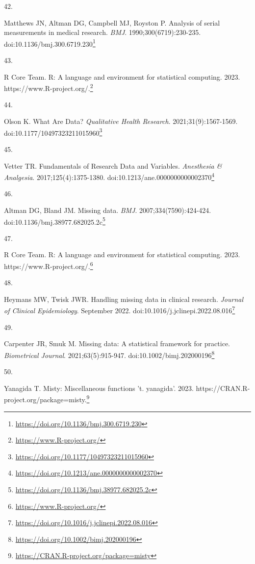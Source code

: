 \documentclass[
  a4paper,
]{book}
\newlength{\cslhangindent}
\newlength{\csllabelwidth}
\newlength{\cslentryspacingunit} %
\newenvironment{CSLReferences}[2] %
 {%
  \setlength{\parindent}{0pt}
  \ifodd #1
  \let\oldpar\par
  \def\par{\hangindent=\cslhangindent\oldpar}
  \fi
  \setlength{\parskip}{#2\cslentryspacingunit}
 }%
 {}
\newcommand{\CSLLeftMargin}[1]{\parbox[t]{\csllabelwidth}{#1}}
\newcommand{\CSLRightInline}[1]{\parbox[t]{\linewidth - \csllabelwidth}{#1}\break}
\renewcommand{\href}[2]{#2\footnote{\url{#1}}}
\begin{document}
\begin{CSLReferences}{0}{0}
\leavevmode{}%
\CSLLeftMargin{42. }%
\CSLRightInline{Matthews JN, Altman DG, Campbell MJ, Royston P. Analysis of serial measurements in medical research. \emph{BMJ}. 1990;300(6719):230-235. doi:\href{https://doi.org/10.1136/bmj.300.6719.230}{10.1136/bmj.300.6719.230}}

\leavevmode{}%
\CSLLeftMargin{43. }%
\CSLRightInline{R Core Team. R: A language and environment for statistical computing. 2023. \href{https://www.R-project.org/}{https://www.R-project.org/.}}

\leavevmode{}%
\CSLLeftMargin{44. }%
\CSLRightInline{Olson K. What Are Data? \emph{Qualitative Health Research}. 2021;31(9):1567-1569. doi:\href{https://doi.org/10.1177/10497323211015960}{10.1177/10497323211015960}}

\leavevmode{}%
\CSLLeftMargin{45. }%
\CSLRightInline{Vetter TR. Fundamentals of Research Data and Variables. \emph{Anesthesia \& Analgesia}. 2017;125(4):1375-1380. doi:\href{https://doi.org/10.1213/ane.0000000000002370}{10.1213/ane.0000000000002370}}

\leavevmode{}%
\CSLLeftMargin{46. }%
\CSLRightInline{Altman DG, Bland JM. Missing data. \emph{BMJ}. 2007;334(7590):424-424. doi:\href{https://doi.org/10.1136/bmj.38977.682025.2c}{10.1136/bmj.38977.682025.2c}}

\leavevmode{}%
\CSLLeftMargin{47. }%
\CSLRightInline{R Core Team. R: A language and environment for statistical computing. 2023. \href{https://www.R-project.org/}{https://www.R-project.org/.}}

\leavevmode{}%
\CSLLeftMargin{48. }%
\CSLRightInline{Heymans MW, Twisk JWR. Handling missing data in clinical research. \emph{Journal of Clinical Epidemiology}. September 2022. doi:\href{https://doi.org/10.1016/j.jclinepi.2022.08.016}{10.1016/j.jclinepi.2022.08.016}}

\leavevmode{}%
\CSLLeftMargin{49. }%
\CSLRightInline{Carpenter JR, Smuk M. Missing data: A statistical framework for practice. \emph{Biometrical Journal}. 2021;63(5):915-947. doi:\href{https://doi.org/10.1002/bimj.202000196}{10.1002/bimj.202000196}}

\leavevmode{}%
\CSLLeftMargin{50. }%
\CSLRightInline{Yanagida T. Misty: Miscellaneous functions 't. yanagida'. 2023. \href{https://CRAN.R-project.org/package=misty}{https://CRAN.R-project.org/package=misty.}}


\end{CSLReferences}
\end{document}
